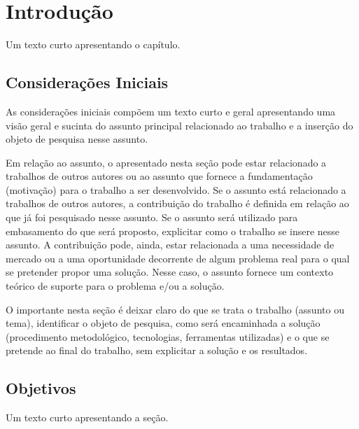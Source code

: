
\chapter{Introdução}\label{cap:introducao}

Um texto curto apresentando o capítulo.

\section{Considerações Iniciais}\label{sec:consideracoesIniciais}

As considerações iniciais compõem um texto curto e geral apresentando uma visão geral e sucinta do assunto principal relacionado ao trabalho e a inserção do objeto de pesquisa nesse assunto.

Em relação ao assunto, o apresentado nesta seção pode estar relacionado a trabalhos de outros autores ou ao assunto que fornece a fundamentação (motivação) para o trabalho a ser desenvolvido. Se o assunto está relacionado a trabalhos de outros autores, a contribuição do trabalho é definida em relação ao que já foi pesquisado nesse assunto. Se o assunto será utilizado para embasamento do que será proposto, explicitar como o trabalho se insere nesse assunto. A contribuição pode, ainda, estar relacionada a uma necessidade de mercado ou a uma oportunidade decorrente de algum problema real para o qual se pretender propor uma solução. Nesse caso, o assunto fornece um contexto teórico de suporte para o problema e/ou a solução.

O importante nesta seção é deixar claro do que se trata o trabalho (assunto ou tema), identificar o objeto de pesquisa, como será encaminhada a solução (procedimento metodológico, tecnologias, ferramentas utilizadas) e o que se pretende ao final do trabalho, sem explicitar a solução e os resultados.

\section{Objetivos}\label{sec:objetivos}

Um texto curto apresentando a seção.


